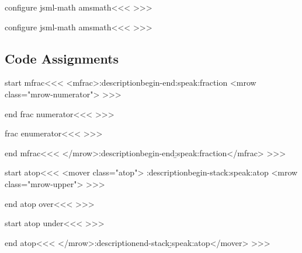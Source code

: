 {\<configure jsml-math amsmath\><<<
\def\atopwithdelims:III#1#2#3{%
   \def\:temp{#2#3}\def\:tempa{..}\ifx \:temp\:tempa
      \Send{GROUP}{0}{|<start atop|>}%
      |<end atop over|>\o:@@atop:
      |<start atop under|>\Send{EndGROUP}{0}{|<end atop|>}
   \else
      \Send{GROUP}{0}%
         {<mo class="mfenced-open">|<lr del 2|></mo>%
          |<start atop|>}%
      |<end atop over|>\o:@@atop:
      |<start atop under|>\Send{EndGROUP}{0}{|<end atop|>%
             <mo class="mfenced-close">|<lr del 3|></mo>}
   \fi
 }
>>>



\<configure jsml-math amsmath\><<<
\def\overwithdelims:III#1#2#3{%
   \def\:temp{#2#3}\def\:tempa{..}\ifx \:temp\:tempa
      \Send{GROUP}{0}{|<start mfrac|>}%
      |<end frac numerator|>\o:over:
      |<frac enumerator|>\Send{EndGROUP}{0}{|<end mfrac|>}
   \else
      \Send{GROUP}{0}%
         {<mo class="mfenced-open">|<lr del 2|></mo>%
          |<start mfrac|>}%
      |<end frac numerator|>\o:@@over:
      |<frac enumerator|>\Send{EndGROUP}{0}{|<end mfrac|>%
         <mo class="mfenced-close">|<lr del 3|></mo>}
   \fi
 }
>>>



\subsection{Code Assignments}



\<start mfrac\><<<
<mfrac>\add:description{begin-end}{\a:speak:fraction}%
<mrow class="mrow-numerator"\Hnewline>%
>>>


\<end frac numerator\><<<
%
>>>



\<frac enumerator\><<<
%
>>>

\<end mfrac\><<<
</mrow>\add:description{begin-end}{\b:speak:fraction}</mfrac>%
>>>


\<start atop\><<<
<mover class="atop">%
\add:description{begin-stack}{\a:speak:atop}%
<mrow class="mrow-upper">%
>>>




\<end atop over\><<<
%
>>>


\<start atop under\><<<
%
>>>


\<end atop\><<<
</mrow>\add:description{end-stack}{\b:speak:atop}</mover>%
>>>




}
